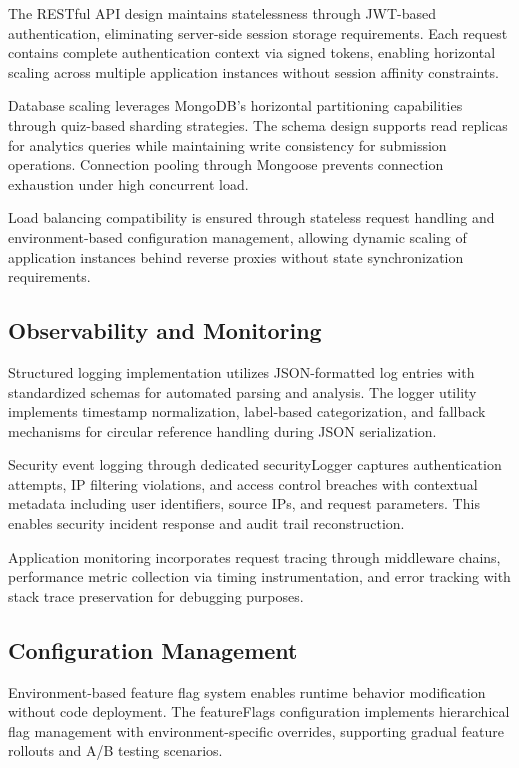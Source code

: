 The RESTful API design maintains statelessness through JWT-based authentication, eliminating server-side session storage requirements. Each request contains complete authentication context via signed tokens, enabling horizontal scaling across multiple application instances without session affinity constraints.

Database scaling leverages MongoDB's horizontal partitioning capabilities through quiz-based sharding strategies. The schema design supports read replicas for analytics queries while maintaining write consistency for submission operations. Connection pooling through Mongoose prevents connection exhaustion under high concurrent load.

Load balancing compatibility is ensured through stateless request handling and environment-based configuration management, allowing dynamic scaling of application instances behind reverse proxies without state synchronization requirements.

\subsection{Observability and Monitoring}

Structured logging implementation utilizes JSON-formatted log entries with standardized schemas for automated parsing and analysis. The logger utility implements timestamp normalization, label-based categorization, and fallback mechanisms for circular reference handling during JSON serialization.

Security event logging through dedicated securityLogger captures authentication attempts, IP filtering violations, and access control breaches with contextual metadata including user identifiers, source IPs, and request parameters. This enables security incident response and audit trail reconstruction.

Application monitoring incorporates request tracing through middleware chains, performance metric collection via timing instrumentation, and error tracking with stack trace preservation for debugging purposes.

\subsection{Configuration Management}

Environment-based feature flag system enables runtime behavior modification without code deployment. The featureFlags configuration implements hierarchical flag management with environment-specific overrides, supporting gradual feature rollouts and A/B testing scenarios.

